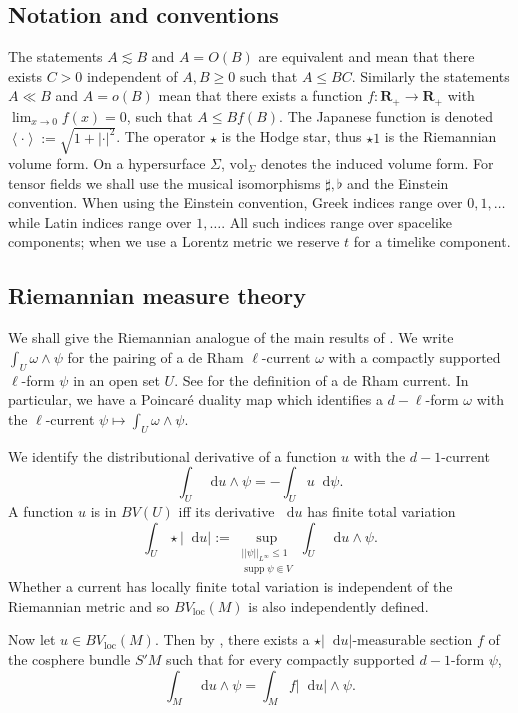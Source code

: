 \documentclass[reqno,12pt,letterpaper]{amsart}
\newcommand{\RR}{\mathbf{R}}
\DeclareMathOperator{\supp}{supp}
\newcommand*\dif{\mathop{}\!\mathrm{d}}
\newcommand{\vol}{\mathrm{vol}}
\newcommand{\loc}{\mathrm{loc}}
\def\Japan#1{\left \langle #1 \right \rangle}
\theoremstyle{definition}
\numberwithin{equation}{section}
\begin{document}
\subsection{Notation and conventions}
The statements $A \lesssim B$ and $A = O(B)$ are equivalent and mean that there exists $C > 0$ independent of $A, B \geq 0$ such that $A \leq BC$.
Similarly the statements $A \ll B$ and $A = o(B)$ mean that there exists a function $f: \RR_+ \to \RR_+$ with $\lim_{x \to 0} f(x) = 0$, such that $A \leq Bf(B)$.
The Japanese function is denoted $\Japan\cdot := \sqrt{1 + |\cdot|^2}$.
The operator $\star$ is the Hodge star, thus $\star 1$ is the Riemannian volume form.
On a hypersurface $\Sigma$, $\vol_\Sigma$ denotes the induced volume form.
For tensor fields we shall use the musical isomorphisms $\sharp, \flat$ and the Einstein convention.
When using the Einstein convention, Greek indices range over $0, 1, \dots$ while Latin indices range over $1, \dots$.
All such indices range over spacelike components; when we use a Lorentz metric we reserve $t$ for a timelike component.

\subsection{Riemannian measure theory}
We shall give the Riemannian analogue of the main results of \cite[Chapter 1]{Giusti77}.
We write $\int_U \omega \wedge \psi$ for the pairing of a de Rham $\ell$-current $\omega$ with a compactly supported $\ell$-form $\psi$ in an open set $U$. See \cite{simon1983GMT} for the definition of a de Rham current.
In particular, we have a Poincar\'e duality map which identifies a $d - \ell$-form $\omega$ with the $\ell$-current $\psi \mapsto \int_U \omega \wedge \psi$.

We identify the distributional derivative of a function $u$ with the $d-1$-current
$$\int_U \dif u \wedge \psi = -\int_U u \dif \psi.$$
A function $u$ is in $BV(U)$ iff its derivative $\dif u$ has finite total variation
\begin{equation}\label{total variation}
\int_U \star |\dif u| := \sup_{\substack{||\psi||_{L^\infty} \leq 1\\\supp \psi \Subset V}} \int_U \dif u \wedge \psi.
\end{equation}
Whether a current has locally finite total variation is independent of the Riemannian metric and so $BV_\loc(M)$ is also independently defined.

Now let $u \in BV_\loc(M)$.
Then by \cite[Theorem 4.14]{simon1983GMT}, there exists a $\star |\dif u|$-measurable section $f$ of the cosphere bundle $S'M$ such that for every compactly supported $d-1$-form $\psi$,
\begin{equation}\label{RNy formula}
\int_M \dif u \wedge \psi = \int_M f|\dif u| \wedge \psi.
\end{equation}
\end{document}
